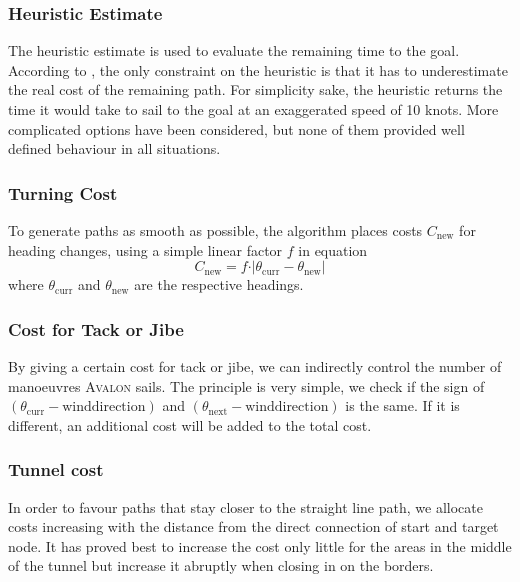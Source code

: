 \subsubsection{Heuristic Estimate}
The heuristic estimate is used to evaluate the remaining time to the goal.
According to \cite{lavalle2006}, the only constraint on the heuristic is that
it has to underestimate the real cost of the remaining path. For simplicity sake, the
heuristic returns the time it would take to sail to the goal at an exaggerated speed of 10 knots. More complicated options have been considered, but none of them provided well defined behaviour in all situations.

\subsubsection{Turning Cost}
To generate paths as smooth as possible, the algorithm places costs $C_{\text{new}}$ for heading changes, using a simple linear factor $f$ in equation
\begin{equation}
 C_{\text{new}} = f \cdot \vert \theta_{\text{curr}} - \theta_{\text{new}} \vert  
\label{eq:navi_turningcost}
\end{equation}
where $\theta_{\text{curr}}$ and $\theta_{\text{new}}$ are the respective headings. 
%
\subsubsection{Cost for Tack or Jibe}
By giving a certain cost for tack or jibe, we can indirectly control the number
of manoeuvres \textsc{Avalon} sails.  The principle is very simple, we check if
the sign of $(\theta_{\text{curr}} - \text{winddirection})$ and $(\theta_{\text{next}} -
\text{winddirection})$ is the same. If it is different, an additional cost will be
added to the total cost.
%
\subsubsection{Tunnel cost}
In order to favour paths that stay closer to the straight line path, we
allocate costs increasing with the distance from the direct connection of start
and target node. It has proved best to increase the cost only little for the
areas in the middle of the tunnel but increase it abruptly when closing in on
the borders. 
%
